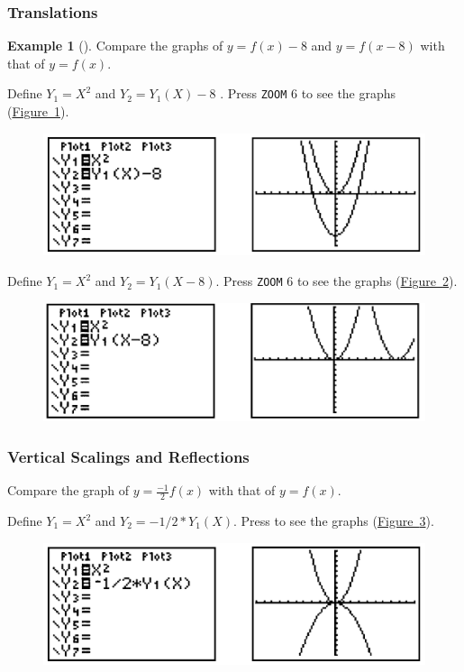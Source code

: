 \documentclass[10pt,]{book}
\theoremstyle{plain}
\theoremstyle{definition}
\theoremstyle{definition}
\newtheorem{example}[theorem]{Example}
\theoremstyle{definition}
\numberwithin{equation}{part}
\begin{document}
\subsubsection[{Translations}]{Translations}\label{subsubsection-5}
\begin{example}[]\label{example-119}
Compare the graphs of \(y = f (x) − 8\) and \(y = f (x − 8)\) with that of \(y = f (x)\).%
\par
Define \(Y_1 = X^2\) and \(Y_2 =Y_1(X) − 8\) . Press \lstinline?ZOOM? \(6\) to see the graphs (\hyperref[fig-GC-vertical-shift]{Figure~\ref{fig-GC-vertical-shift}}). \leavevmode%
\begin{figure}
\centering
\includegraphics[width=0.5\linewidth]{images/fig-GC-vertical-shift.jpg}
\caption{\label{fig-GC-vertical-shift}}
\end{figure}
%
\par
Define \(Y_1 = X^2\) and \(Y_2 =Y_1(X − 8)\). Press \lstinline?ZOOM? \(6\) to see the graphs (\hyperref[fig-GC-horizontal-shift]{Figure~\ref{fig-GC-horizontal-shift}}). \leavevmode%
\begin{figure}
\centering
\includegraphics[width=0.5\linewidth]{images/fig-GC-horizontal-shift.jpg}
\caption{\label{fig-GC-horizontal-shift}}
\end{figure}
%
\end{example}
\typeout{************************************************}
\typeout{************************************************}
\subsubsection[{Vertical Scalings and Reflections}]{Vertical Scalings and Reflections}\label{subsubsection-6}
Compare the graph of \(y = \frac{−1}{2} f (x)\) with that of \(y = f (x)\).%
\par
Define \(Y_1 = X^2\) and \(Y_2 = −1/2*Y_1(X)\). Press to see the graphs (\hyperref[fig-GC-vertical-flip]{Figure~\ref{fig-GC-vertical-flip}}). \leavevmode%
\begin{figure}
\centering
\includegraphics[width=0.5\linewidth]{images/fig-GC-vertical-flip.jpg}
\caption{\label{fig-GC-vertical-flip}}
\end{figure}
%
\typeout{************************************************}
\typeout{************************************************}
\end{document}
